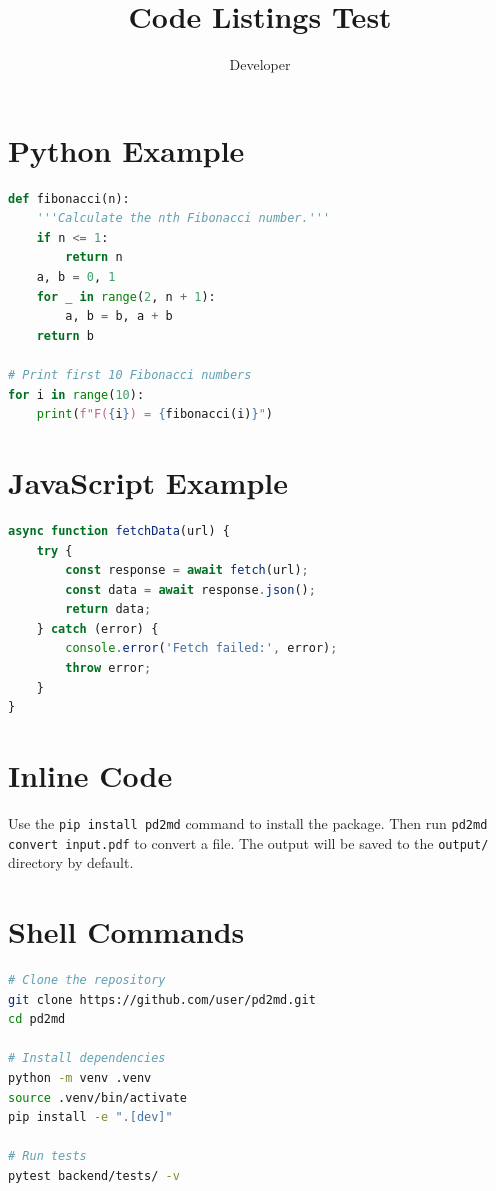 \documentclass[12pt]{article}
\title{Code Listings Test}
\author{Developer}
\begin{document}
\maketitle

\section{Python Example}
\begin{lstlisting}[language=Python]
def fibonacci(n):
    '''Calculate the nth Fibonacci number.'''
    if n <= 1:
        return n
    a, b = 0, 1
    for _ in range(2, n + 1):
        a, b = b, a + b
    return b

# Print first 10 Fibonacci numbers
for i in range(10):
    print(f"F({i}) = {fibonacci(i)}")
\end{lstlisting}

\section{JavaScript Example}
\begin{lstlisting}[language=JavaScript]
async function fetchData(url) {
    try {
        const response = await fetch(url);
        const data = await response.json();
        return data;
    } catch (error) {
        console.error('Fetch failed:', error);
        throw error;
    }
}
\end{lstlisting}

\section{Inline Code}
Use the \texttt{pip install pd2md} command to install the package. Then run
\texttt{pd2md convert input.pdf} to convert a file. The output will be saved
to the \texttt{output/} directory by default.

\section{Shell Commands}
\begin{lstlisting}[language=bash]
# Clone the repository
git clone https://github.com/user/pd2md.git
cd pd2md

# Install dependencies
python -m venv .venv
source .venv/bin/activate
pip install -e ".[dev]"

# Run tests
pytest backend/tests/ -v
\end{lstlisting}
\end{document}
